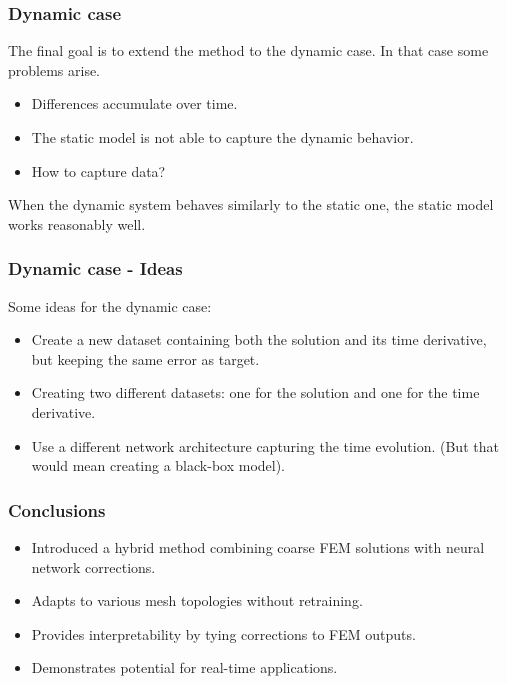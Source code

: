 \documentclass{beamer}
\begin{document}
\begin{frame}
    \frametitle{Dynamic case}
    The final goal is to extend the method to the dynamic case. In that case some problems arise.
    \begin{itemize}
        \item Differences accumulate over time.
        \item The static model is not able to capture the dynamic behavior.
        \item How to capture data?
    \end{itemize}
    When the dynamic system behaves similarly to the static one, the static model works reasonably well.
\end{frame}

\begin{frame}
    \frametitle{Dynamic case - Ideas}
    Some ideas for the dynamic case:
    \begin{itemize}
        \item Create a new dataset containing both the solution and its time derivative, but keeping the same error as target.
        \item Creating two different datasets: one for the solution and one for the time derivative.
        \item Use a different network architecture capturing the time evolution. (But that would mean creating a black-box model).
    \end{itemize}
\end{frame}

\begin{frame}
    \frametitle{Conclusions}
    \begin{itemize}
        \item Introduced a hybrid method combining coarse FEM solutions with neural network corrections.
        \item Adapts to various mesh topologies without retraining.
        \item Provides interpretability by tying corrections to FEM outputs.
        \item Demonstrates potential for real-time applications.
    \end{itemize}
\end{frame}
\end{document}
